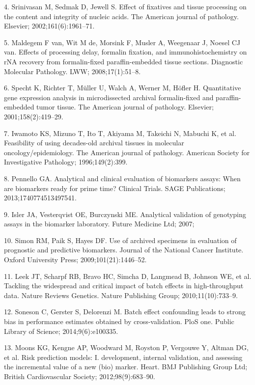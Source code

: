 \documentclass[11pt]{article}
\begin{document}
4. Srinivasan M, Sedmak D, Jewell S. Effect of fixatives and tissue
processing on the content and integrity of nucleic acids. The American
journal of pathology. Elsevier; 2002;161(6):1961--71.

5. Maldegem F van, Wit M de, Morsink F, Musler A, Weegenaar J, Noesel CJ
van. Effects of processing delay, formalin fixation, and
immunohistochemistry on rNA recovery from formalin-fixed
paraffin-embedded tissue sections. Diagnostic Molecular Pathology. LWW;
2008;17(1):51--8.

6. Specht K, Richter T, M{ü}ller U, Walch A, Werner M, H{ö}fler H.
Quantitative gene expression analysis in microdissected archival
formalin-fixed and paraffin-embedded tumor tissue. The American journal
of pathology. Elsevier; 2001;158(2):419--29.

7. Iwamoto KS, Mizuno T, Ito T, Akiyama M, Takeichi N, Mabuchi K, et al.
Feasibility of using decades-old archival tissues in molecular
oncology/epidemiology. The American journal of pathology. American
Society for Investigative Pathology; 1996;149(2):399.

8. Pennello GA. Analytical and clinical evaluation of biomarkers assays:
When are biomarkers ready for prime time? Clinical Trials. SAGE
Publications; 2013;1740774513497541.

9. Isler JA, Vesterqvist OE, Burczynski ME. Analytical validation of
genotyping assays in the biomarker laboratory. Future Medicine Ltd;
2007;

10. Simon RM, Paik S, Hayes DF. Use of archived specimens in evaluation
of prognostic and predictive biomarkers. Journal of the National Cancer
Institute. Oxford University Press; 2009;101(21):1446--52.

11. Leek JT, Scharpf RB, Bravo HC, Simcha D, Langmead B, Johnson WE, et
al. Tackling the widespread and critical impact of batch effects in
high-throughput data. Nature Reviews Genetics. Nature Publishing Group;
2010;11(10):733--9.

12. Soneson C, Gerster S, Delorenzi M. Batch effect confounding leads to
strong bias in performance estimates obtained by cross-validation. PloS
one. Public Library of Science; 2014;9(6):e100335.

13. Moons KG, Kengne AP, Woodward M, Royston P, Vergouwe Y, Altman DG,
et al. Risk prediction models: I. development, internal validation, and
assessing the incremental value of a new (bio) marker. Heart. BMJ
Publishing Group Ltd; British Cardiovascular Society;
2012;98(9):683--90.
\end{document}
